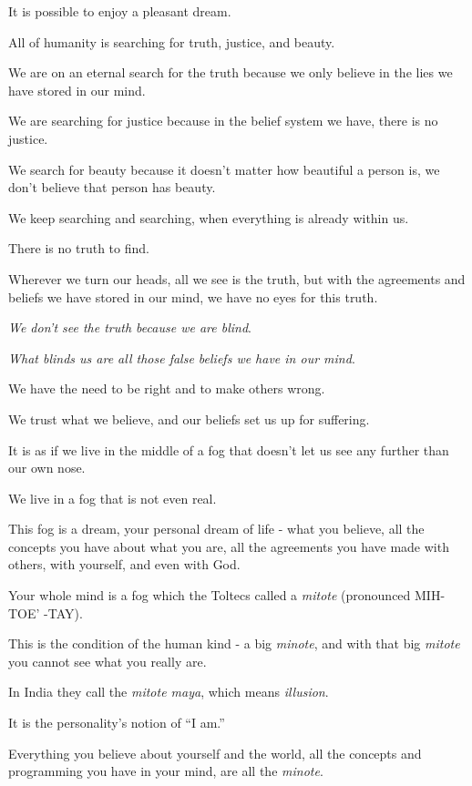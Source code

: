 \documentclass{article}
\numberwithin{equation}{section}
\begin{document}
It is possible to enjoy a pleasant dream.

%
All of humanity is searching for truth, justice, and beauty.

We are on an eternal search for the truth because we only believe in the lies we have stored in our mind.

We are searching for justice because in the belief system we have, there is no justice.

We search for beauty because it doesn't matter how beautiful a person is, we don't believe that person has beauty.

We keep searching and searching, when everything is already within us.

There is no truth to find.

Wherever we turn our heads, all we see is the truth, but with the agreements and beliefs we have stored in our mind, we have no eyes for this truth.

%
\textit{We don't see the truth because we are blind}.

\textit{What blinds us are all those false beliefs we have in our mind}.

We have the need to be right and to make others wrong.

We trust what we believe, and our beliefs set us up for suffering.

It is as if we live in the middle of a fog that doesn't let us see any further than our own nose.

We live in a fog that is not even real.

This fog is a dream, your personal dream of life - what you believe, all the concepts you have about what you are, all the agreements you have made with others, with yourself, and even with God.

%
Your whole mind is a fog which the Toltecs called a \textit{mitote} (pronounced MIH-TOE' -TAY).


This is the condition of the human kind - a big \textit{minote}, and with that big \textit{mitote} you cannot see what you really are.

In India they call the \textit{mitote maya}, which means \textit{illusion}.

It is the personality's notion of ``I am.''

Everything you believe about yourself and the world, all the concepts and programming you have in your mind, are all the \textit{minote}.
\end{document}
